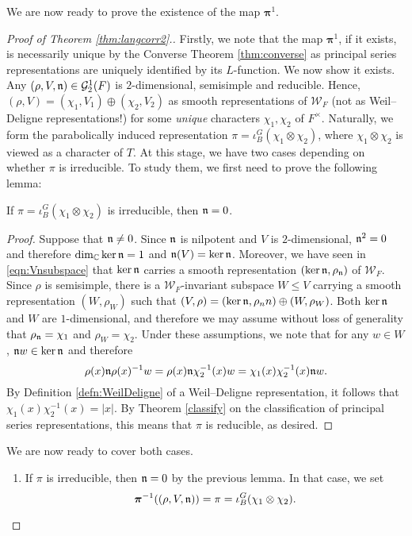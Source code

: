 We are now ready to prove the existence of the map $\bm\pi^1$.
\begin{proof}[Proof of Theorem \ref{thm:langcorr2}.]
    Firstly, we note that the map $\bm\pi^{1}$, if it exists, is necessarily unique by the Converse Theorem \ref{thm:converse} as principal series representations are uniquely identified by its $L$-function. We now show it exists. Any $(\rho,V,\mathfrak{n})\in\mathcal{G}_2^1(F)$ is $2$-dimensional, semisimple and reducible. Hence, $(\rho,V)=(\chi_1,V_1)\oplus(\chi_2,V_2)$ as smooth representations of $\mathcal{W}_F$ (not as Weil--Deligne representations!) for some \textit{unique} characters $\chi_1,\chi_2$ of $F^\times$. Naturally, we form the parabolically induced representation $\pi=\iota_B^G(\chi_1\otimes\chi_2)$, where $\chi_1\otimes\chi_2$ is viewed as a character of $T$. At this stage, we have two cases depending on whether $\pi$ is irreducible. To study them, we first need to prove the following lemma:
    \begin{lemma}
        If $\pi=\iota_B^G(\chi_1\otimes\chi_2)$ is irreducible, then $\mathfrak{n}=0$.
    \end{lemma}
    \begin{proof}
        Suppose that $\mathfrak{n}\neq 0$. Since $\mathfrak{n}$ is nilpotent and $V$ is $2$-dimensional, $\mathfrak{n}^2=0$ and therefore $\dim_{\mathbb{C}}\ker\mathfrak{n}=1$ and $\mathfrak{n}(V)=\ker\mathfrak{n}$. Moreover, we have seen in \eqref{eqn:Vnsubspace} that $\ker\mathfrak{n}$ carries a smooth representation $(\ker\mathfrak{n},\rho_{\mathfrak{n}})$ of $\mathcal{W}_F$. Since $\rho$ is semisimple, there is a $\mathcal{W}_F$-invariant subspace $W\leq V$ carrying a smooth representation $(W,\rho_W)$ such that $(V,\rho)=(\ker\mathfrak{n},\rho_nn)\oplus(W,\rho_W)$. Both $\ker\mathfrak{n}$ and $W$ are $1$-dimensional, and therefore we may assume without loss of generality that $\rho_{\mathfrak{n}}=\chi_1$ and $\rho_W=\chi_2$. Under these assumptions, we note that for any $w\in W$, $\mathfrak{n} w\in\ker\mathfrak{n}$ and therefore
        $$\rho(x)\mathfrak{n}\rho(x)^{-1}w=\rho(x)\mathfrak{n}\chi^{-1}_2(x)w=\chi_1(x)\chi_2^{-1}(x)\mathfrak{n} w.$$
        By Definition \ref{defn:WeilDeligne} of a Weil--Deligne representation, it follows that $\chi_1(x)\chi_2^{-1}(x)=|x|$. By Theorem \ref{classify} on the classification of principal series representations, this means that $\pi$ is reducible, as desired.
    \end{proof}
    We are now ready to cover both cases.
    \begin{enumerate}[(1)]
        \item If $\pi$ is irreducible, then $\mathfrak{n}=0$ by the previous lemma. In that case, we set 
        $$\bm\pi^{-1}((\rho,V,\mathfrak{n}))=\pi=\iota_B^G(\chi_1\otimes\chi_2).$$

\end{enumerate}
\end{proof}
